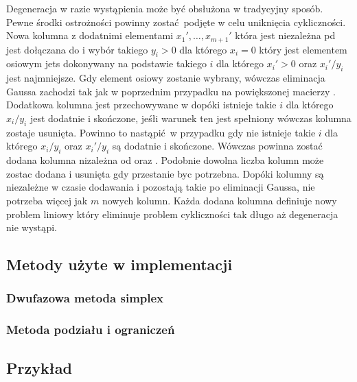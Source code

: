 \begin{enumerate}
Degeneracja w razie wystąpienia może być obsłużona w tradycyjny sposób. Pewne środki ostrożności powinny zostać podjęte w celu uniknięcia cykliczności. Nowa kolumna  z dodatnimi elementami $x_1',\dots,x_{m+1}'$ która jest niezależna pd  jest dołączana do  i wybór takiego $y_i > 0$ dla którego $x_i = 0$ który jest elementem osiowym jets dokonywany na podstawie takiego $i$ dla którego $x_i' > 0$ oraz $x_i'/y_i$ jest najmniejsze. Gdy element osiowy zostanie wybrany, wówczas eliminacja Gaussa zachodzi tak jak w poprzednim przypadku na powiększonej macierzy . Dodatkowa kolumna jest przechowywane w  dopóki istnieje takie $i$ dla którego $x_i/y_i$ jest dodatnie i skończone, jeśłi warunek ten jest spełniony wówczas kolumna zostaje usunięta. Powinno to nastąpić w przypadku gdy nie istnieje takie $i$ dla którego $x_i/y_i$ oraz $x_i'/y_i$ są dodatnie i skończone. Wówczas powinna zostać dodana kolumna  nizależna od  oraz . Podobnie dowolna liczba kolumn może zostac dodana i usunięta gdy przestanie byc potrzebna. Dopóki kolumny są niezależne w czasie dodawania i pozostają takie po eliminacji Gaussa, nie potrzeba więcej jak $m$ nowych kolumn. Każda dodana kolumna definiuje nowy problem liniowy który eliminuje problem cykliczności tak długo aż degeneracja nie wystąpi.

\end{enumerate}

\subsection{Metody użyte w implementacji}

\subsubsection{Dwufazowa metoda simplex}
\subsubsection{Metoda podziału i ograniczeń}

\subsection{Przykład}
